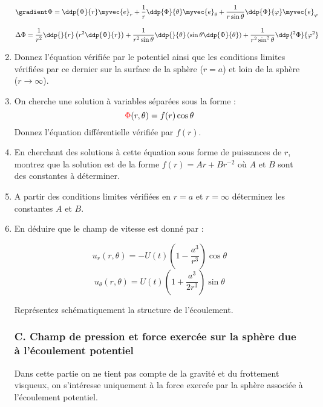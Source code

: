 \begin{enumerate}
$$
\gradient \Phi = \ddp{\Phi}{r} \myvec{e}_r 
+ \frac{1}{r}\ddp{\Phi}{\theta} \myvec{e}_\theta 
+ \frac{1}{r \sin \theta}\ddp{\Phi}{\varphi} \myvec{e}_\varphi
$$

$$
\Delta \Phi = \frac{1}{r^2} \ddp{}{r} \left( r^2 \ddp{\Phi}{r} \right) 
+ \frac{1}{r^2\sin \theta} \ddp{}{\theta} \left( \sin \theta \ddp{\Phi}{\theta} \right)
+ \frac{1}{r^2\sin^2 \theta} \ddp{^2\Phi}{\varphi^2} 
$$


\item Donnez l'équation vérifiée par le potentiel ainsi que les conditions limites vérifiées par ce dernier sur la surface de la sphère ($r=a$) et loin de la sphère ($r \rightarrow \infty$).

\item On cherche une solution à variables séparées sous la forme :
$$
{\color{red} \Phi} (r,\theta) =  f(r) \cos \theta
$$
Donnez l'équation différentielle vérifiée par $f(r)$. 

\item En cherchant des solutions à cette équation sous forme de puissances de $r$, 
montrez que la solution est de la forme $f(r) = A r + B r^{-2}$ où $A$ et $B$ sont des constantes à déterminer.

\item A partir des conditions limites vérifiées en $r=a$ et $r= \infty$ déterminez les constantes $A$ et $B$.

\item En déduire que le champ de vitesse est donné par :

$$
u_r(r,\theta)= -U(t) \left( 1 - \frac{a^3}{r^3} \right) \cos \theta
$$ 
$$
u_\theta(r,\theta)
 = U(t) \left( 1 + \frac{a^3}{2r^3} \right) \sin \theta
 $$

Représentez schématiquement la structure de l'écoulement.

\subsubsection*{C. Champ de pression et force exercée sur la sphère due à l'écoulement potentiel}

Dans cette partie on ne tient pas compte de la gravité et du frottement visqueux, on s'intéresse uniquement à la force exercée par la sphère associée à l'écoulement potentiel.



\end{enumerate}
